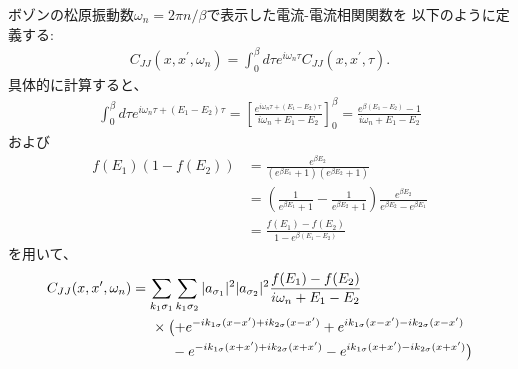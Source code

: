 \documentclass[10pt,a4j]{jarticle}
\begin{document}
ボゾンの松原振動数$\omega_n = 2\pi n/\beta$で表示した電流-電流相関関数を
以下のように定義する:
\begin{align}
C_{JJ}(x,x^\prime,\omega_n) = \int_0^\beta d\tau e^{i\omega_n \tau} C_{JJ}(x,x^\prime,\tau). 
\end{align}
具体的に計算すると、
\begin{align}
\int_0^{\beta} d\tau e^{i\omega_n \tau + (E_1-E_2)\tau}
= \left[ \frac{e^{i\omega_n \tau + (E_1-E_2)\tau}}{i\omega_n + E_1-E_2} \right]_0^\beta
= \frac{e^{\beta (E_1-E_2)}-1}{i\omega_n + E_1-E_2}
\end{align}
および
\begin{align}
f(E_1) (1-f(E_2)) &= \frac{e^{\beta E_2}}{(e^{\beta E_1}+1)(e^{\beta E_2}+1)} \nonumber \\
&= \left(\frac{1}{e^{\beta E_1}+1} - \frac{1}{e^{\beta E_2}+1}\right) \frac{e^{\beta E_2}}{e^{\beta E_2} - e^{\beta E_1}}
\nonumber \\
&= \frac{f(E_1) - f(E_2)}{1-e^{\beta(E_1-E_2)}}
\end{align}
を用いて、
\begin{align}
C_{JJ}(x,x^\prime,\omega_n) &= \sum_{k_1\sigma_1} \sum_{k_1\sigma_2} |a_{\sigma_1}|^2  |a_{\sigma_2}|^2
\frac{f(E_1)-f(E_2)}{i\omega_n + E_1-E_2}
\nonumber \\
& \hspace{5mm} \times \bigl( +e^{-ik_{1\sigma}(x-x^\prime)+ik_{2\sigma}(x-x^\prime)}
+ e^{ik_{1\sigma}(x-x^\prime)-ik_{2\sigma}(x-x^\prime)} \\
& \hspace{10mm} -e^{-ik_{1\sigma}(x+x^\prime)+ik_{2\sigma}(x+x^\prime)}
- e^{ik_{1\sigma}(x+x^\prime)-ik_{2\sigma}(x+x^\prime)}\bigr)
\end{align}
\end{document}
